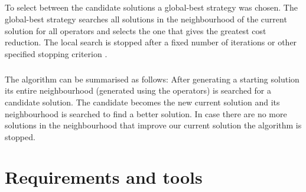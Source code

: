 \documentclass[a4paper,twoside,12pt]{book}
\begin{document}
\paragraph{}
To select between the candidate solutions a global-best strategy was chosen. The global-best strategy searches all solutions in the neighbourhood of the current solution for all operators and selects the one that gives the greatest cost reduction. The local search is stopped after a fixed number of iterations or other specified stopping criterion \cite{bib:article:LocalSearchLambda}. 
\paragraph{}
The algorithm can be summarised as follows: After generating a starting solution its entire neighbourhood (generated using the operators) is searched for a candidate solution. The candidate becomes the new current solution and its neighbourhood is searched to find a better solution. In case there are no more solutions in the neighbourhood that improve our current solution the algorithm is stopped.
\chapter{Requirements and tools}
\end{document}
